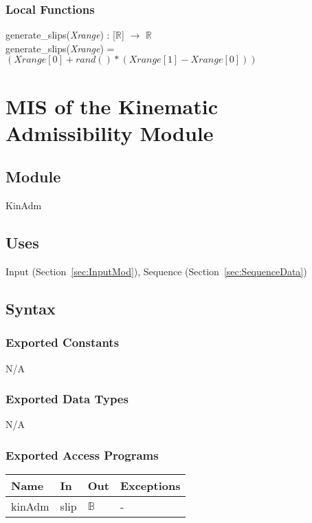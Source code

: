 \documentclass[12pt, titlepage]{article}
\begin{document}
\subsubsection{Local Functions}
generate\_slips(\textit{Xrange}) : [$\mathbb{R}$] $\rightarrow$ $\mathbb{R}$\\
generate\_slips(\textit{Xrange}) = $(Xrange[0] + rand()*(Xrange[1] - 
Xrange[0]))$



\section{MIS of the Kinematic Admissibility
	Module} \label{sec:KinAdmMod}

\subsection{Module}
KinAdm

\subsection{Uses}
Input (Section~\ref{sec:InputMod}), Sequence (Section~\ref{sec:SequenceData})

\subsection{Syntax}

\subsubsection{Exported Constants}
N/A

\subsubsection{Exported Data Types}
N/A

\subsubsection{Exported Access Programs}

\begin{center}
	\renewcommand*{\arraystretch}{1.5}
	\begin{tabular} {p{}  p{}  p{} 
			p{} } \hline 
		\textbf{Name} & \textbf{In} & \textbf{Out} & \textbf{Exceptions} \\ 
		\hline
		
		kinAdm & slip & $\mathbb{B}$ & - \\ \hline
		
	\end{tabular}
\end{center}
\end{document}
